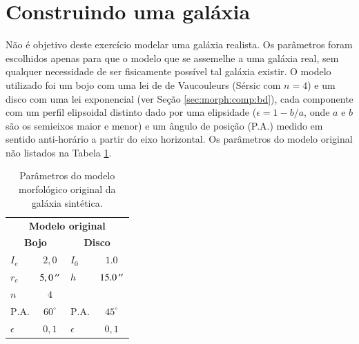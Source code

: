 \section{Construindo uma galáxia}

Não é objetivo deste exercício modelar uma galáxia realista. Os parâmetros foram
escolhidos apenas para que o modelo que se assemelhe a uma galáxia real, sem
qualquer necessidade de ser fisicamente possível tal galáxia existir. O modelo
utilizado foi um bojo com uma lei de de Vaucouleurs (Sérsic com $n=4$) e um
disco com uma lei exponencial (ver Seção \ref{sec:morph:comp:bd}), cada
componente com um perfil elipsoidal distinto dado por uma elipsidade ($\epsilon
= 1 - b/a$, onde $a$ e $b$ são os semieixos maior e menor) e um ângulo de
posição (P.A.) medido em sentido anti-horário a partir do eixo horizontal. Os
parâmetros do modelo original não listados na Tabela
\ref{tab:testeModeloOriginal}.

\begin{table}
\begin{tabular}{ l  c | l  c }
  \hline
  \multicolumn{4}{c}{\textbf{Modelo original}} \\
  \multicolumn{2}{c}{\textbf{Bojo}} & \multicolumn{2}{c}{\textbf{Disco}} \\
  \hline
  $I_e$ & $2,0$ & $I_0$ & $1.0$ \\
  $r_e$ & $5,0\,^{\prime\prime}$ & $h$ & $15.0\,^{\prime\prime}$ \\
  $n$ & $4$ & & \\
  $\mathrm{P.A.}$ & $60^\circ$ & $\mathrm{P.A.}$ & $45^\circ$ \\
  $\epsilon$ & $0,1$ & $\epsilon$ & $0,1$ \\
  \hline
\end{tabular}
\caption[Modelo morfológico original da galáxia sintética]
{Parâmetros do modelo morfológico original da galáxia sintética.}
\label{tab:testeModeloOriginal}
\end{table}

